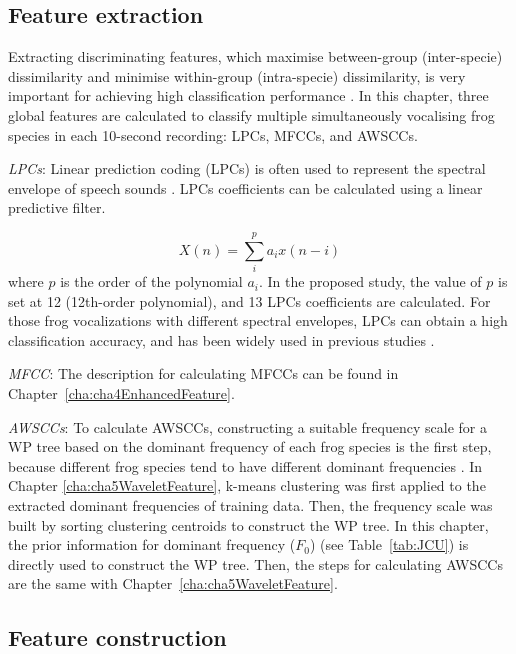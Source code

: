\subsection{Feature extraction}
Extracting discriminating features, which maximise between-group (inter-specie) dissimilarity and minimise within-group (intra-specie) dissimilarity, is very important for achieving high classification performance \citep{huang2009frog, bedoya2014automatic}. In this chapter, three global features are calculated to classify multiple simultaneously vocalising frog species in each 10-second recording: LPCs, MFCCs, and AWSCCs. 


\textit{LPCs}: Linear prediction coding (LPCs) is often used to represent the spectral envelope of speech sounds \citep{itakura1975line}. LPCs coefficients can be calculated using a linear predictive filter.

\begin{equation}
X(n) = \sum_{i}^{p}a_{i}x(n-i)
\end{equation}
where $p$ is the order of the polynomial $a_{i}$. In the proposed study, the value of $p$ is set at 12 (12th-order polynomial), and 13 LPCs coefficients are calculated. For those frog vocalizations with different spectral envelopes, LPCs can obtain a high classification accuracy, and has been widely used in previous studies \cite{yuan2013frog, jaafarcomparative, jaafar2015effect}.

\textit{MFCC}: The description for calculating MFCCs can be found in Chapter~\ref{cha:cha4EnhancedFeature}. 


\textit{AWSCCs}: To calculate AWSCCs, constructing a suitable frequency scale for a WP tree based on the dominant frequency of each frog species is the first step, because different frog species tend to have different dominant frequencies \citep{Gingras2013}. In Chapter \ref{cha:cha5WaveletFeature}, k-means clustering was first applied to the extracted dominant frequencies of training data. Then, the frequency scale was built by sorting clustering centroids to construct the WP tree. In this chapter, the prior information for dominant frequency ($F_{0}$) (see Table~\ref{tab:JCU}) is directly used to construct the WP tree. Then, the steps for calculating AWSCCs are the same with Chapter~\ref{cha:cha5WaveletFeature}. 

\subsection{Feature construction}

